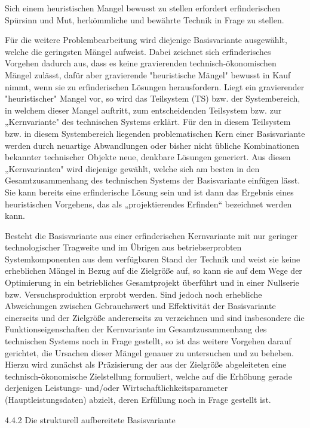 \documentclass[12pt,a4paper]{article}
\begin{document}
Sich einem heuristischen Mangel bewusst zu stellen erfordert erfinderischen Spürsinn und Mut, herkömmliche und bewährte Technik in Frage zu stellen.

Für die weitere Problembearbeitung wird diejenige Basisvariante ausgewählt, welche die geringsten Mängel aufweist. Dabei zeichnet sich erfinderisches Vorgehen dadurch aus, dass es keine gravierenden technisch-ökonomischen Mängel zulässt, dafür aber gravierende "heuristische Mängel" bewusst in Kauf nimmt, wenn sie zu erfinderischen Lösungen herausfordern. Liegt ein gravierender "heuristischer" Mangel vor, so wird das Teilsystem (TS) bzw. der Systembereich, in welchem dieser Mangel auftritt, zum entscheidenden Teilsystem bzw. zur „Kernvariante" des technischen Systems erklärt. Für den in diesem Teilsystem bzw. in diesem Systembereich liegenden problematischen Kern einer Basisvariante werden durch neuartige Abwandlungen oder bisher nicht übliche Kombinationen bekannter technischer Objekte neue, denkbare Lösungen generiert. Aus diesen „Kernvarianten" wird diejenige gewählt, welche sich am besten in den Gesamtzusammenhang des technischen Systems der Basisvariante einfügen lässt. Sie kann bereits eine erfinderische Lösung sein und ist dann das Ergebnis eines heuristischen Vorgehens, das als „projektierendes Erfinden“ bezeichnet werden kann.

Besteht die Basisvariante aus einer erfinderischen Kernvariante mit nur geringer technologischer Tragweite und im Übrigen aus betriebserprobten Systemkomponenten aus dem verfügbaren Stand der Technik und weist sie keine erheblichen Mängel in Bezug auf die Zielgröße auf, so kann sie auf dem Wege der Optimierung in ein betriebliches Gesamtprojekt überführt und in einer Nullserie bzw. Versuchsproduktion erprobt werden. Sind jedoch noch erhebliche Abweichungen zwischen Gebrauchswert und Effektivität der Basisvariante einerseits und der Zielgröße andererseits zu verzeichnen und sind insbesondere die Funktionseigenschaften der Kernvariante im Gesamtzusammenhang des technischen Systems noch in Frage gestellt, so ist das weitere Vorgehen darauf gerichtet, die Ursachen dieser Mängel genauer zu untersuchen und zu beheben. Hierzu wird zunächst als Präzisierung der aus der Zielgröße abgeleiteten eine technisch-ökonomische Zielstellung formuliert, welche auf die Erhöhung gerade derjenigen Leistungs- und/oder Wirtschaftlichkeitsparameter (Hauptleistungsdaten) abzielt, deren Erfüllung noch in Frage gestellt ist.


4.4.2  Die strukturell aufbereitete Basisvariante
\end{document}

